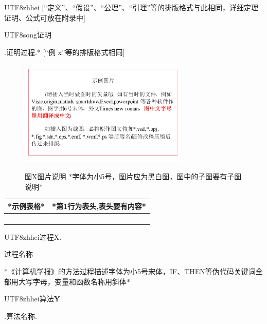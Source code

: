 \documentclass[10.5pt,compsoc]{CjC}
\theoremstyle{mystyle}
\begin{document}
\begin{CJK*}{UTF8}{zhhei}
[``定义''、``假设''、``公理''、``引理''等的排版格式与此相同，详细定理证明、公式可放在附录中]

{\begin{CJK*}{UTF8}{song}证明\end{CJK*}}.\quad  *证明过程.* [``例 x''等的排版格式相同]


\begin{figure}[htbp]
\centerline{\includegraphics[width=3.15in,height=1.98in]{CJC1.pdf}}
图X\quad  图片说明 *字体为小5号，图片应为黑白图，图中的子图要有子图说明*
\label{fig1}
\end{figure}

\begin{table}[htbp]
\vspace {-2.5mm}
\begin{center}
\begin{tabular}{ll}
\toprule
*示例表格*&*第1行为表头,表头要有内容* \\
\hline
&
 \\
&
 \\
&
 \\
&
 \\
\bottomrule
\end{tabular}
\label{tab1}
\end{center}
\end{table}

\begin{CJK*}{UTF8}{zhhei}过程X.\end{CJK*}\quad 过程名称

{*《计算机学报》的方法过程描述字体为小5号宋体，IF、THEN等伪代码关键词全部用大写字母，变量和函数名称用斜体*}


\begin{CJK*}{UTF8}{zhhei}算法\textbf{Y}\end{CJK*}.\quad 算法名称.
\end{CJK*}
\end{document}
